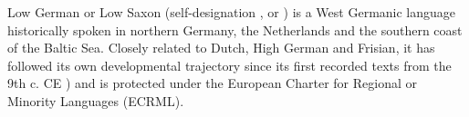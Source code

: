 Low German or Low Saxon (self-designation ,  or ) is a West Germanic language historically spoken in northern Germany, the Netherlands and the southern coast of the Baltic Sea. Closely related to Dutch, High German and Frisian, it has followed its own developmental trajectory since its first recorded texts from the 9th c. CE \cite{price-2010-heliand-phd}) and is protected under the European Charter for Regional or Minority Languages (ECRML).
